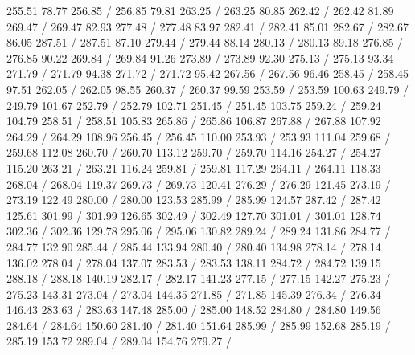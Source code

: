 { 255.51 78.77 256.85 /
 256.85 79.81 263.25 /
 263.25 80.85 262.42 /
 262.42 81.89 269.47 /
 269.47 82.93 277.48 /
 277.48 83.97 282.41 /
 282.41 85.01 282.67 /
 282.67 86.05 287.51 /
 287.51 87.10 279.44 /
 279.44 88.14 280.13 /
 280.13 89.18 276.85 /
 276.85 90.22 269.84 /
 269.84 91.26 273.89 /
 273.89 92.30 275.13 /
 275.13 93.34 271.79 /
 271.79 94.38 271.72 /
 271.72 95.42 267.56 /
 267.56 96.46 258.45 /
 258.45 97.51 262.05 /
 262.05 98.55 260.37 /
 260.37 99.59 253.59 /
 253.59 100.63 249.79 /
 249.79 101.67 252.79 /
 252.79 102.71 251.45 /
 251.45 103.75 259.24 /
 259.24 104.79 258.51 /
 258.51 105.83 265.86 /
 265.86 106.87 267.88 /
 267.88 107.92 264.29 /
 264.29 108.96 256.45 /
 256.45 110.00 253.93 /
 253.93 111.04 259.68 /
 259.68 112.08 260.70 /
 260.70 113.12 259.70 /
 259.70 114.16 254.27 /
 254.27 115.20 263.21 /
 263.21 116.24 259.81 /
 259.81 117.29 264.11 /
 264.11 118.33 268.04 /
 268.04 119.37 269.73 /
 269.73 120.41 276.29 /
 276.29 121.45 273.19 /
 273.19 122.49 280.00 /
 280.00 123.53 285.99 /
 285.99 124.57 287.42 /
 287.42 125.61 301.99 /
 301.99 126.65 302.49 /
 302.49 127.70 301.01 /
 301.01 128.74 302.36 /
 302.36 129.78 295.06 /
 295.06 130.82 289.24 /
 289.24 131.86 284.77 /
 284.77 132.90 285.44 /
 285.44 133.94 280.40 /
 280.40 134.98 278.14 /
 278.14 136.02 278.04 /
 278.04 137.07 283.53 /
 283.53 138.11 284.72 /
 284.72 139.15 288.18 /
 288.18 140.19 282.17 /
 282.17 141.23 277.15 /
 277.15 142.27 275.23 /
 275.23 143.31 273.04 /
 273.04 144.35 271.85 /
 271.85 145.39 276.34 /
 276.34 146.43 283.63 /
 283.63 147.48 285.00 /
 285.00 148.52 284.80 /
 284.80 149.56 284.64 /
 284.64 150.60 281.40 /
 281.40 151.64 285.99 /
 285.99 152.68 285.19 /
 285.19 153.72 289.04 /
 289.04 154.76 279.27 /
}
